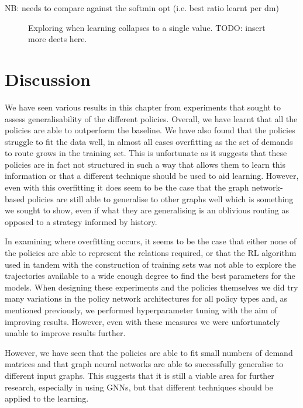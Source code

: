 NB: needs to compare against the softmin opt (i.e. best ratio learnt per dm)

\begin{figure}
    \centering
%    
    \caption{Exploring when learning collapses to a single value. TODO: insert more deets here.}
    \label{fig:exp_fail}
\end{figure}


\section{Discussion}
We have seen various results in this chapter from experiments that sought to assess generalisability of the different policies. Overall, we have learnt that all the policies are able to outperform the baseline. We have also found that the policies struggle to fit the data well, in almost all cases overfitting as the set of demands to route grows in the training set. This is unfortunate as it suggests that these policies are in fact not structured in such a way that allows them to learn this information or that a different technique should be used to aid learning. However, even with this overfitting it does seem to be the case that the graph network-based policies are still able to generalise to other graphs well which is something we sought to show, even if what they are generalising is an oblivious routing as opposed to a strategy informed by history.

In examining where overfitting occurs, it seems to be the case that either none of the policies are able to represent the relations required, or that the RL algorithm used in tandem with the construction of training sets was not able to explore the trajectories available to a wide enough degree to find the best parameters for the models. When designing these experiments and the policies themselves we did try many variations in the policy network architectures for all policy types and, as mentioned previously, we performed hyperparameter tuning with the aim of improving results. However, even with these measures we were unfortunately unable to improve results further.

However, we have seen that the policies are able to fit small numbers of demand matrices and that graph neural networks are able to successfully generalise to different input graphs. This suggests that it is still a viable area for further research, especially in using GNNs, but that different techniques should be applied to the learning.

